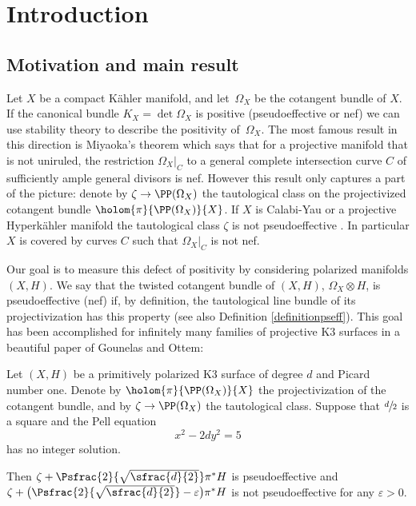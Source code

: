 \vspace*{-2\baselineskip}
\Changel

\section{Introduction}

\subsection{Motivation and main result}

Let $X$ be a compact Kähler manifold, and let~$\Omega_X$ be the cotangent bundle of $X$.
If the canonical bundle $K_X = \det \Omega_X$ is positive (\eg pseudoeffective or nef) we can use stability theory to describe the positivity of~$\Omega_X$. The most famous result in this direction is Miyaoka's theorem \cite{Miy87}
which says that for a projective manifold that is not uniruled, the restriction $\Omega_X|_C$ to a general complete intersection curve $C$ of sufficiently ample general divisors is nef. However this result only captures a part of the picture:
denote by $\zeta \to \PP(\Omega_X)$ the tautological class on the projectivized
cotangent bundle $\holom{\pi}{\PP(\Omega_X)}{X}$. If $X$ is Calabi-Yau or a projective Hyperkähler manifold
the tautological class $\zeta$ is not pseudoeffective \cite[Th.\,1.6]{HP19}. In particular $X$ is covered by curves $C$
such that $\Omega_X|_C$ is not nef.

Our goal is to measure this defect of positivity by considering polarized manifolds $(X, H)$. We say that the twisted cotangent bundle of $(X, H)$, \ie $\Omega_X\otimes H$, is pseudoeffective (\resp nef)
if, by definition, the tautological line bundle of its projectivization has this property (see also Definition \ref{definitionpseff}).
This goal has been accomplished for infinitely many families of projective K3 surfaces in a beautiful paper
of Gounelas and Ottem:

\begin{theorem}[{\cite[Th.\,B]{GO18}}]\label{gounelas}
Let $(X, H)$ be a primitively polarized K3 surface of degree $d$ and Picard number one.
Denote by $\holom{\pi}{\PP(\Omega_X)}{X}$ the projectivization of the cotangent bundle, and by $\zeta \to \PP(\Omega_X)$ the tautological class. Suppose that $\sfrac{d}{2}$ is a square and the Pell equation
\[
x^2-2 dy^2=5
\]
has no integer solution.

Then $\zeta+\Psfrac{2}{\sqrt{\sfrac{d}{2}}}\pi^*H$ is pseudoeffective and
\hbox{$\zeta+\bigl(\Psfrac{2}{\sqrt{\sfrac{d}{2}}}-\varepsilon\bigr)\pi^*H$} is not pseudoeffective for any $\varepsilon>0$.
\end{theorem}

